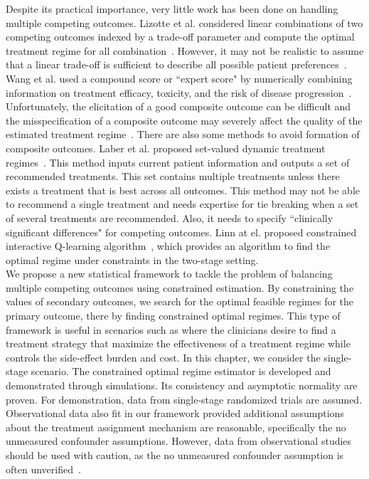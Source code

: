 \documentclass{article}
\begin{document}
 Despite its practical importance, very little work has been done on handling multiple competing outcomes. Lizotte et al. considered linear combinations of two competing outcomes indexed by a trade-off parameter and compute the optimal treatment regime for all combination~\cite{Lizotte2010}. However, it may not be realistic to assume that a linear trade-off is sufficient to describe all possible patient preferences~\cite{LaberTwo2014}. Wang et al. used a compound score or ``expert score" by numerically combining information on treatment efficacy, toxicity, and the risk of disease progression~\cite{Wang2012}. Unfortunately, the elicitation of a good composite outcome can be difficult and the misspecification of a composite outcome may severely affect the quality of the estimated treatment regime~\cite{Laber2014}. There are also some methods to avoid formation of composite outcomes. Laber et al. proposed set-valued dynamic treatment regimes~\cite{LaberTwo2014}. This method inputs current patient information and outputs a set of recommended treatments. This set contains multiple treatments unless there exists a treatment that is best across all outcomes. This method may not be able to recommend a single treatment and needs expertise for tie breaking when a set of several treatments are recommended. Also, it needs to specify ``clinically significant differences" for competing outcomes. Linn at el. proposed constrained interactive Q-learning algorithm~\cite{Linn2014a}, which provides an algorithm to find the optimal regime under constraints in the two-stage setting.\\

We propose a new statistical framework to tackle the problem of balancing multiple competing outcomes using constrained estimation. By constraining the values of secondary outcomes, we search for the optimal feasible regimes for the primary outcome, there by finding constrained optimal regimes. This type of framework is useful in scenarios such as where the clinicians desire to find a treatment strategy that maximize the effectiveness of a treatment regime while controls the side-effect burden and cost. In this chapter, we consider the single-stage scenario. The constrained optimal regime estimator is developed and demonstrated through simulations. Its consistency and asymptotic normality are proven. For demonstration, data from single-stage randomized trials are assumed. Observational data also fit in our framework provided additional assumptions about the treatment assignment mechanism are reasonable, specifically the no unmeasured confounder assumptions. However, data from observational studies should be used with caution, as the no unmeasured confounder assumption is often unverified~\cite{Chakraborty2013}.
\end{document}
